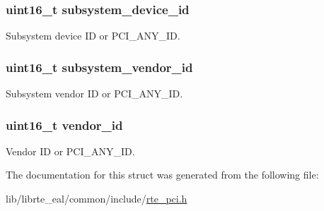 \subsubsection[{subsystem\+\_\+device\+\_\+id}]{\setlength{\rightskip}{0pt plus 5cm}uint16\+\_\+t subsystem\+\_\+device\+\_\+id}\label{structrte__pci__id_a8a8b8a0ce1242424f0b4918890a0b6f7}
Subsystem device I\+D or P\+C\+I\+\_\+\+A\+N\+Y\+\_\+\+I\+D. \hypertarget{structrte__pci__id_a6acc9abcfadbfbf47d2269f323fc36b8}{}
\subsubsection[{subsystem\+\_\+vendor\+\_\+id}]{\setlength{\rightskip}{0pt plus 5cm}uint16\+\_\+t subsystem\+\_\+vendor\+\_\+id}\label{structrte__pci__id_a6acc9abcfadbfbf47d2269f323fc36b8}
Subsystem vendor I\+D or P\+C\+I\+\_\+\+A\+N\+Y\+\_\+\+I\+D. \hypertarget{structrte__pci__id_abd60aba7846c925f784c3e89e2f54e45}{}
\subsubsection[{vendor\+\_\+id}]{\setlength{\rightskip}{0pt plus 5cm}uint16\+\_\+t vendor\+\_\+id}\label{structrte__pci__id_abd60aba7846c925f784c3e89e2f54e45}
Vendor I\+D or P\+C\+I\+\_\+\+A\+N\+Y\+\_\+\+I\+D. 

The documentation for this struct was generated from the following file\+:\begin{DoxyCompactItemize}
\item 
lib/librte\+\_\+eal/common/include/\hyperlink{rte__pci_8h}{rte\+\_\+pci.\+h}\end{DoxyCompactItemize}
